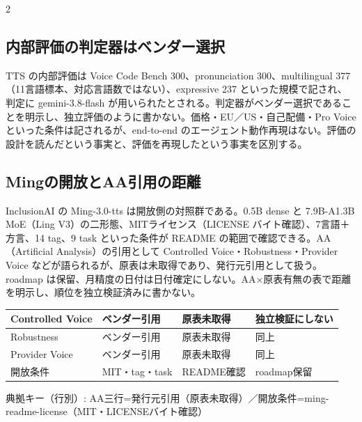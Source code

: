 \documentclass[lualatex,a4paper,10pt]{jlreq}
\begin{document}
\begin{multicols}{2} %


\subsection*{内部評価の判定器はベンダー選択}


TTS の内部評価は Voice Code Bench 300、pronunciation 300、multilingual 377（11言語標本、対応言語数ではない）、expressive 237 といった規模で記され、判定に gemini-3.8-flash が用いられたとされる。判定器がベンダー選択であることを明示し、独立評価のように書かない。価格・EU／US・自己配備・Pro Voice といった条件は記されるが、end-to-end のエージェント動作再現はない。評価の設計を読んだという事実と、評価を再現したという事実を区別する。


\subsection*{Mingの開放とAA引用の距離}


InclusionAI の Ming-3.0-tts は開放側の対照群である。0.5B dense と 7.9B-A1.3B MoE（Ling V3）の二形態、MITライセンス（LICENSE バイト確認）、7言語＋方言、14 tag、9 task といった条件が README の範囲で確認できる。AA（Artificial Analysis）の引用として Controlled Voice・Robustness・Provider Voice などが語られるが、原表は未取得であり、発行元引用として扱う。roadmap は保留、月精度の日付は日付確定にしない。AA×原表有無の表で距離を明示し、順位を独立検証済みに書かない。


\end{multicols} %
{\centering\footnotesize
{}
\begin{tabularx}{0.96\linewidth}{@{}lXXX@{}}
\toprule
Controlled Voice & ベンダー引用 & 原表未取得 & 独立検証にしない \\
\midrule
Robustness & ベンダー引用 & 原表未取得 & 同上 \\
Provider Voice & ベンダー引用 & 原表未取得 & 同上 \\
開放条件 & MIT・tag・task & README確認 & roadmap保留 \\
\bottomrule
\end{tabularx}
{\scriptsize\color{SurveyMuted} 典拠キー（行別）: AA三行=発行元引用（原表未取得）／開放条件=ming-readme-license（MIT・LICENSEバイト確認）\par}
} %
\end{document}
